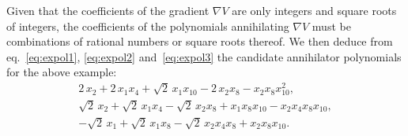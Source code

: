 \documentclass[11pt,a4paper]{article}
\begin{document}
	Given that the coefficients of the gradient $\nabla V$ are only integers and square roots of integers, the coefficients of the polynomials annihilating $\nabla V$ must be combinations of rational numbers or square roots thereof. We then deduce from eq.~\eqref{eq:expol1}, \eqref{eq:expol2} and~\eqref{eq:expol3} the candidate annihilator polynomials for the above example:
	\begin{equation}
		\begin{gathered}
			2\,x_{2} + 2\,x_{1}x_{4} + \sqrt{2}\,x_{1}x_{10} - 2\,x_{2}x_{8} - x_{2}x_{8}x_{10}^{2},\\[5pt]
	      \sqrt{2}\,x_{2} + \sqrt{2}\,x_{1}x_{4} - \sqrt{2}\,x_{2}x_{8} + x_{1}x_{8}x_{10} - x_{2}x_{4}x_{8}x_{10}, \\[5pt]
	      -\sqrt{2}\,x_{1} + \sqrt{2}\,x_{1}x_{8} - \sqrt{2}\,x_{2}x_{4}x_{8} + x_{2}x_{8}x_{10}.
		\end{gathered}
	\end{equation}
\end{document}
